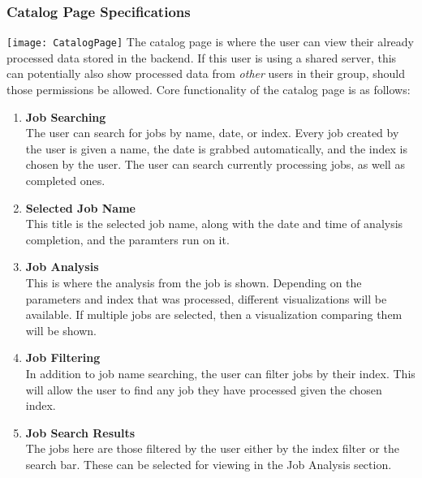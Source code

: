 \subsubsection{Catalog Page Specifications}
\texttt{[image: CatalogPage]}
The catalog page is where the user can view their already processed data stored in the backend. If this user is using a shared server, this can potentially also show processed data from \textit{other} users in their group, should those permissions be allowed. Core functionality of the catalog page is as follows:\\
\begin{enumerate}
    \item \textbf{Job Searching}\\ The user can search for jobs by name, date, or index. Every job created by the user is given a name, the date is grabbed automatically, and the index is chosen by the user. The user can search currently processing jobs, as well as completed ones.
    \item \textbf{Selected Job Name}\\ This title is the selected job name, along with the date and time of analysis completion, and the paramters run on it.
    \item \textbf{Job Analysis}\\ This is where the analysis from the job is shown. Depending on the parameters and index that was processed, different visualizations will be available. If multiple jobs are selected, then a visualization comparing them will be shown.
    \item \textbf{Job Filtering}\\ In addition to job name searching, the user can filter jobs by their index. This will allow the user to find any job they have processed given the chosen index.
    \item \textbf{Job Search Results}\\ The jobs here are those filtered by the user either by the index filter or the search bar. These can be selected for viewing in the Job Analysis section.
\end{enumerate}